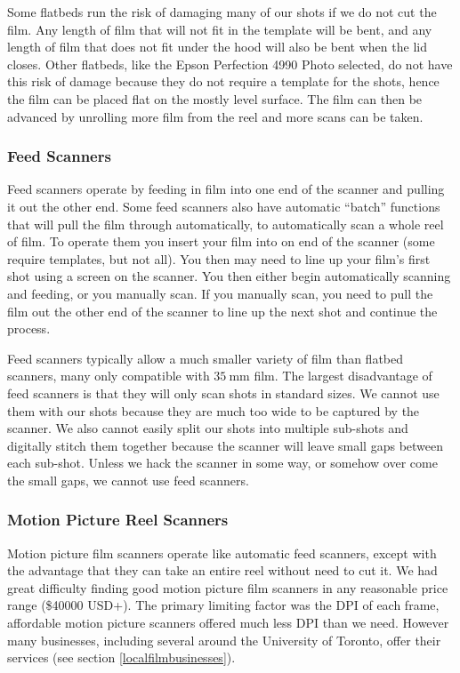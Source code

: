 \documentclass[12pt]{article} %
\begin{document}
Some flatbeds run the risk of damaging many of our shots if we do not cut the film. Any length of film that will not fit in the template will be bent, and any length of film that does not fit under the hood will also be bent when the lid closes. Other flatbeds, like the Epson Perfection 4990 Photo selected, do not have this risk of damage because they do not require a template for the shots, hence the film can be placed flat on the mostly level surface. The film can then be advanced by unrolling more film from the reel and more scans can be taken.

\subsubsection{Feed Scanners}
Feed scanners operate by feeding in film into one end of the scanner and pulling it out the other end. Some feed scanners also have automatic ``batch” functions that will pull the film through automatically, to automatically scan a whole reel of film. To operate them you insert your film into on end of the scanner (some require templates, but not all). You then may need to line up your film’s first shot using a screen on the scanner. You then either begin automatically scanning and feeding, or you manually scan. If you manually scan, you need to pull the film out the other end of the scanner to line up the next shot and continue the process.

Feed scanners typically allow a much smaller variety of film than flatbed scanners, many only compatible with $35 \ \text{mm}$ film. The largest disadvantage of feed scanners is that they will only scan shots in standard sizes. We cannot use them with our shots because they are much too wide to be captured by the scanner. We also cannot easily split our shots into multiple sub-shots and digitally stitch them together because the scanner will leave small gaps between each sub-shot. Unless we hack the scanner in some way, or somehow over come the small gaps, we cannot use feed scanners.

\subsubsection{Motion Picture Reel Scanners}
Motion picture film scanners operate like automatic feed scanners, except with the advantage that they can take an entire reel without need to cut it. We had great difficulty finding good motion picture film scanners in any reasonable price range (\$40000 USD+). The primary limiting factor was the DPI of each frame, affordable motion picture scanners offered much less DPI than we need. However many businesses, including several around the University of Toronto, offer their services (see section \ref{localfilmbusinesses}).
\end{document}
